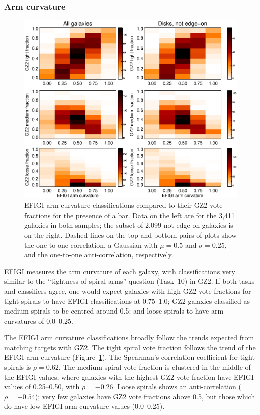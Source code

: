 \documentclass[useAMS,usenatbib]{mn2e}
\begin{document}
\subsubsection{Arm curvature}

\begin{figure}
\includegraphics[angle=0,width=7.0in]{figures/efigi_arm_curvature.eps}
\caption{EFIGI arm curvature classifications compared to their GZ2 vote fractions for the presence of a bar. Data on the left are for the 3,411 galaxies in both samples; the subset of 2,099 not edge-on galaxies is on the right. Dashed lines on the top and bottom pairs of plots show the one-to-one correlation, a Gaussian with $\mu=0.5$ and $\sigma=0.25$, and the one-to-one anti-correlation, respectively. 
\label{fig-efigi_arms}}
\end{figure}

EFIGI measures the arm curvature of each galaxy, with classifications very similar to the ``tightness of spiral arms'' question (Task~10) in GZ2. If both tasks and classifiers agree, one would expect galaxies with high GZ2 vote fractions for tight spirals to have EFIGI classifications at 0.75--1.0; GZ2 galaxies classified as medium spirals to be centred around 0.5; and loose spirals to have arm curvatures of 0.0--0.25. 

The EFIGI arm curvature classifications broadly follow the trends expected from matching targets with GZ2. The tight spiral vote fraction follows the trend of the EFIGI arm curvature (Figure~\ref{fig-efigi_arms}). The Spearman's correlation coefficient for tight spirals is $\rho=0.62$. The medium spiral vote fraction is clustered in the middle of the EFIGI values, where galaxies with the highest GZ2 vote fraction have EFIGI values of 0.25--0.50, with $\rho=-0.26$. Loose spirals shows an anti-correlation ($\rho=-0.54$); very few galaxies have GZ2 vote fractions above 0.5, but those which do have low EFIGI arm curvature values (0.0--0.25). 
\end{document}

